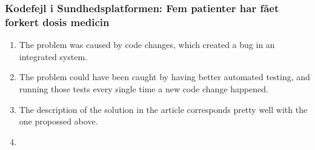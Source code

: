 \documentclass{article}
\begin{document}
\subsubsection*{Kodefejl i Sundhedsplatformen: Fem patienter har fået forkert dosis medicin}
\begin{enumerate}
    \item The problem was caused by code changes, which created a bug in an integrated system. 
    \item The problem could have been caught by having better automated testing, and running those tests every single time a new code change happened.
    \item The description of the solution in the article corresponds pretty well with the one propossed above.
    \item 
\end{enumerate}
\end{document}
